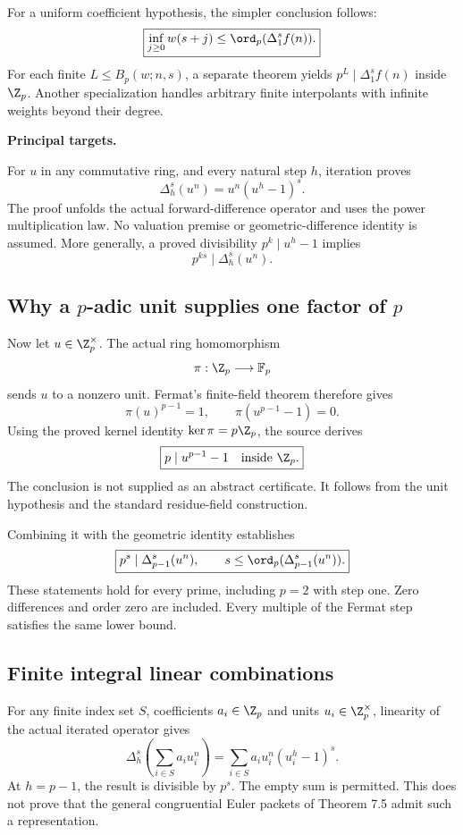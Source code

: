 For a uniform coefficient hypothesis, the simpler conclusion follows:
\[
 \boxed{\inf_{j\geq0} w(s+j)\leq\ord_p(\Delta_1^s f(n)).}
\]
For each finite $L\leq B_p(w;n,s)$, a separate theorem yields $p^L\mid\Delta_1^s f(n)$ inside $\Z_p$. Another specialization handles arbitrary finite interpolants with infinite weights beyond their degree.

\textbf{Principal targets.}\par
{}\par
{}\par
{}
\par\medskip
{}
For $u$ in any commutative ring, and every natural step $h$, iteration proves
\[
 \boxed{\Delta_h^s(u^n)=u^n(u^h-1)^s.}
\]
The proof unfolds the actual forward-difference operator and uses the power multiplication law. No valuation premise or geometric-difference identity is assumed. More generally, a proved divisibility $p^k\mid u^h-1$ implies
\[
 p^{ks}\mid\Delta_h^s(u^n).
\]

\subsection*{Why a $p$-adic unit supplies one factor of $p$}
Now let $u\in\Z_p^\times$. The actual ring homomorphism
\[
 \pi:\Z_p\longrightarrow\mathbb F_p
\]
 sends $u$ to a nonzero unit. Fermat's finite-field theorem therefore gives
\[
 \pi(u)^{p-1}=1,\qquad \pi(u^{p-1}-1)=0.
\]
Using the proved kernel identity $\ker\pi=p\Z_p$, the source derives
\[
 \boxed{p\mid u^{p-1}-1\quad\text{inside }\Z_p.}
\]
The conclusion is not supplied as an abstract certificate. It follows from the unit hypothesis and the standard residue-field construction.

Combining it with the geometric identity establishes
\[
 \boxed{p^s\mid\Delta_{p-1}^s(u^n),\qquad
 s\leq\ord_p(\Delta_{p-1}^s(u^n)).}
\]
These statements hold for every prime, including $p=2$ with step one. Zero differences and order zero are included. Every multiple of the Fermat step satisfies the same lower bound.

\subsection*{Finite integral linear combinations}
For any finite index set $S$, coefficients $a_i\in\Z_p$ and units $u_i\in\Z_p^\times$, linearity of the actual iterated operator gives
\[
 \Delta_h^s\!\left(\sum_{i\in S}a_i u_i^n\right)
 =\sum_{i\in S}a_i u_i^n(u_i^h-1)^s.
\]
At $h=p-1$, the result is divisible by $p^s$. The empty sum is permitted. This does not prove that the general congruential Euler packets of Theorem 7.5 admit such a representation.

